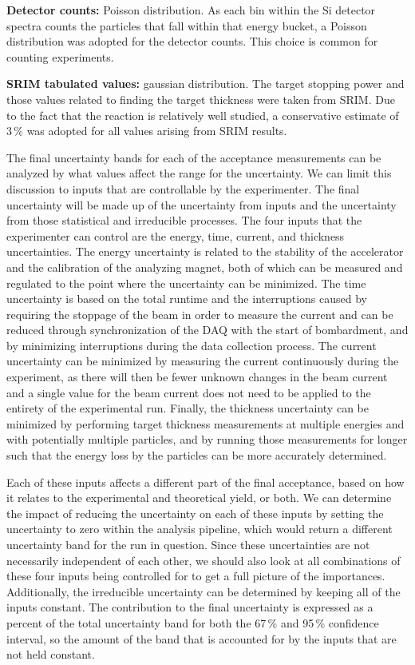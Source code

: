 \textbf{Detector counts:} Poisson distribution. As each bin within the
Si detector spectra counts the particles that fall within that energy
bucket, a Poisson distribution was adopted for the detector counts. This
choice is common for counting experiments.

\textbf{SRIM tabulated values:} gaussian distribution. The target
stopping power and those values related to finding the target thickness
were taken from SRIM. Due to the fact that the \alpa{} reaction is
relatively well studied, a conservative estimate of 3\,\% was adopted
for all values arising from SRIM results.

The final uncertainty bands for each of the acceptance measurements can
be analyzed by what values affect the range for the uncertainty. We can
limit this discussion to inputs that are controllable by the
experimenter. The final uncertainty will be made up of the uncertainty
from inputs and the uncertainty from those statistical and irreducible
processes. The four inputs that the experimenter can control are the
energy, time, current, and thickness uncertainties. The energy
uncertainty is related to the stability of the accelerator and the
calibration of the analyzing magnet, both of which can be measured and
regulated to the point where the uncertainty can be minimized. The time
uncertainty is based on the total runtime and the interruptions caused
by requiring the stoppage of the beam in order to measure the current
and can be reduced through synchronization of the DAQ with the start of
bombardment, and by minimizing interruptions during the data collection
process. The current uncertainty can be minimized by measuring the
current continuously during the experiment, as there will then be fewer
unknown changes in the beam current and a single value for the beam
current does not need to be applied to the entirety of the experimental
run. Finally, the thickness uncertainty can be minimized by performing
target thickness measurements at multiple energies and with potentially
multiple particles, and by running those measurements for longer such
that the energy loss by the particles can be more accurately determined.

Each of these inputs affects a different part of the final acceptance,
based on how it relates to the experimental and theoretical yield, or
both. We can determine the impact of reducing the uncertainty on each of
these inputs by setting the uncertainty to zero within the analysis
pipeline, which would return a different uncertainty band for the run in
question. Since these uncertainties are not necessarily independent of
each other, we should also look at all combinations of these four inputs
being controlled for to get a full picture of the importances.
Additionally, the irreducible uncertainty can be determined by keeping
all of the inputs constant. The contribution to the final uncertainty is
expressed as a percent of the total uncertainty band for both the 67\,\%
and 95\,\% confidence interval, so the amount of the band that is
accounted for by the inputs that are not held constant.

